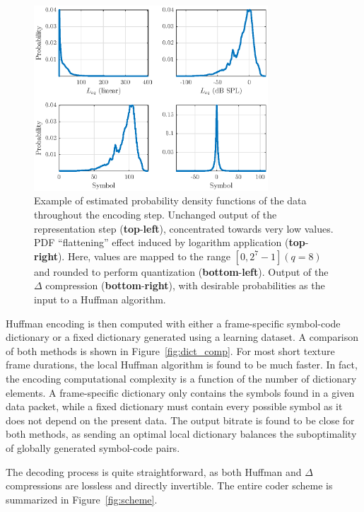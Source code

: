 \documentclass[sensors,article,accept,moreauthors,pdftex,10pt,a4paper]{mdpi}
\begin{document}
\begin{figure}[H]
	\centering
		\includegraphics[width=0.78\textwidth]{figures/pdf.eps}
	\caption{Example of estimated probability density functions of the data throughout the encoding step. Unchanged output of the representation step (\textbf{top}-\textbf{left}), concentrated towards very low values. PDF ``flattening'' effect induced by logarithm application (\textbf{top}-\textbf{right}). {Here,} values are mapped to the range $[0, 2^7-1] (q=8)$ and rounded to perform quantization (\textbf{bottom}-\textbf{left}). Output of the $\Delta$ compression  (\textbf{bottom}-\textbf{right}), with desirable probabilities as the input to a Huffman algorithm.}
	\label{fig:pdf}
\end{figure}

Huffman encoding is then computed with either a frame-specific symbol-code dictionary or a fixed dictionary generated using a learning dataset. A comparison of both methods is shown in Figure~\ref{fig:dict_comp}. For most short texture frame durations, the local Huffman algorithm is found to be much faster. In fact, the encoding computational complexity is a function of the number of dictionary elements. A frame-specific dictionary only contains the symbols found in a given data packet, while a fixed dictionary must contain every possible symbol as it does not depend on the present data. The output bitrate is found to be close for both methods, as sending an optimal local dictionary balances the suboptimality of globally generated symbol-code pairs.

The decoding process is quite straightforward, as both Huffman and $\Delta$ compressions are lossless and directly invertible. The entire coder scheme is summarized in Figure~\ref{fig:scheme}.
\vspace{-12pt} 
\end{document}
